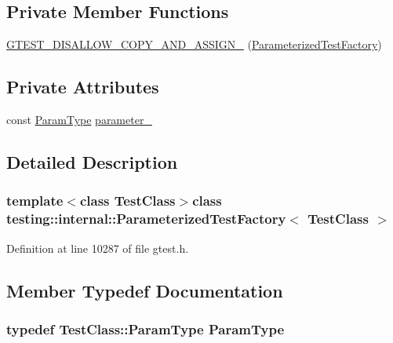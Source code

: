 \subsection*{\-Private \-Member \-Functions}
\begin{DoxyCompactItemize}
\item 
\hyperlink{classtesting_1_1internal_1_1ParameterizedTestFactory_ae1d1da35ba15fcf35030a2393ea4fa06}{\-G\-T\-E\-S\-T\-\_\-\-D\-I\-S\-A\-L\-L\-O\-W\-\_\-\-C\-O\-P\-Y\-\_\-\-A\-N\-D\-\_\-\-A\-S\-S\-I\-G\-N\-\_\-} (\hyperlink{classtesting_1_1internal_1_1ParameterizedTestFactory}{\-Parameterized\-Test\-Factory})
\end{DoxyCompactItemize}
\subsection*{\-Private \-Attributes}
\begin{DoxyCompactItemize}
\item 
const \hyperlink{classtesting_1_1internal_1_1ParameterizedTestFactory_a221aa0ab26352e74f11bdf2f9e058f09}{\-Param\-Type} \hyperlink{classtesting_1_1internal_1_1ParameterizedTestFactory_a380a3075b00f15b8e95cdc96ec8b8c65}{parameter\-\_\-}
\end{DoxyCompactItemize}


\subsection{\-Detailed \-Description}
\subsubsection*{template$<$class Test\-Class$>$class testing\-::internal\-::\-Parameterized\-Test\-Factory$<$ Test\-Class $>$}



\-Definition at line 10287 of file gtest.\-h.



\subsection{\-Member \-Typedef \-Documentation}
\hypertarget{classtesting_1_1internal_1_1ParameterizedTestFactory_a221aa0ab26352e74f11bdf2f9e058f09}{
\subsubsection[{\-Param\-Type}]{\setlength{\rightskip}{0pt plus 5cm}typedef \-Test\-Class\-::\-Param\-Type {\bf \-Param\-Type}}}\label{da/d84/classtesting_1_1internal_1_1ParameterizedTestFactory_a221aa0ab26352e74f11bdf2f9e058f09}


